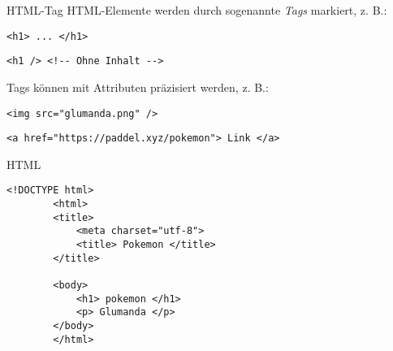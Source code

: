 \begin{defi}{HTML-Tag}
    HTML-Elemente werden durch sogenannte \emph{Tags} markiert, z. B.:

    \begin{lstlisting}[language=html5]
        <h1> ... </h1>
    \end{lstlisting}

    \begin{lstlisting}[language=html5]
        <h1 /> <!-- Ohne Inhalt -->
    \end{lstlisting}

    Tags können mit Attributen präzisiert werden, z. B.:

    \begin{lstlisting}[language=html5]
        <img src="glumanda.png" />
    \end{lstlisting}

    \begin{lstlisting}[language=html5]
        <a href="https://paddel.xyz/pokemon"> Link </a>
    \end{lstlisting}
\end{defi}

\begin{example}{HTML}
    \begin{lstlisting}[language=html5]
        <!DOCTYPE html>
        <html>
        <title>
            <meta charset="utf-8">
            <title> Pokemon </title>
        </title>

        <body>
            <h1> pokemon </h1>
            <p> Glumanda </p>
        </body>
        </html>
    \end{lstlisting}
\end{example}

